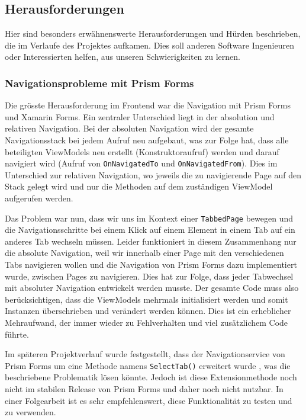 \subsection{Herausforderungen}
Hier sind besonders erwähnenswerte Herausforderungen und Hürden beschrieben, die im Verlaufe des Projektes aufkamen. Dies soll anderen Software Ingenieuren oder Interessierten helfen, aus unseren Schwierigkeiten zu lernen. 


\subsubsection{Navigationsprobleme mit Prism Forms}\label{subsub:navigation}

Die grösste Herausforderung im Frontend war die Navigation mit Prism Forms und Xamarin Forms. Ein zentraler Unterschied liegt in der absolution und relativen Navigation. Bei der absoluten Navigation wird der gesamte Navigationsstack bei jedem Aufruf neu aufgebaut, was zur Folge hat, dass alle beteiligten ViewModels neu erstellt (Konstruktoraufruf) werden und darauf navigiert wird (Aufruf von \texttt{OnNavigatedTo} und \texttt{OnNavigatedFrom}). Dies im Unterschied zur relativen Navigation, wo jeweils die zu navigierende Page auf den Stack gelegt wird und nur die Methoden auf dem zuständigen ViewModel aufgerufen werden. 

Das Problem war nun, dass wir uns im Kontext einer \texttt{TabbedPage} bewegen und die Navigationsschritte bei einem Klick auf einem Element in einem Tab auf ein anderes Tab wechseln müssen. Leider funktioniert in diesem Zusammenhang nur die absolute Navigation, weil wir innerhalb einer Page mit den verschiedenen Tabs navigieren wollen und die Navigation von Prism Forms dazu implementiert wurde, zwischen Pages zu navigieren. Dies hat zur Folge, dass jeder Tabwechsel mit absoluter Navigation entwickelt werden musste. Der gesamte Code muss also berücksichtigen, dass die ViewModels mehrmals initialisiert werden und somit Instanzen überschrieben und verändert werden können. Dies ist ein erheblicher Mehraufwand, der immer wieder zu Fehlverhalten und viel zusätzlichem Code führte. 

Im späteren Projektverlauf wurde festgestellt, dass der Navigationservice von Prism Forms um eine Methode namens \texttt{SelectTab()} erweitert wurde \cite{prism-selecttab}, was die beschriebene Problematik lösen könnte. Jedoch ist diese Extensionmethode noch nicht im stabilen Release von Prism Forms und daher noch nicht nutzbar. In einer Folgearbeit ist es sehr empfehlenswert, diese Funktionalität zu testen und zu verwenden. 

